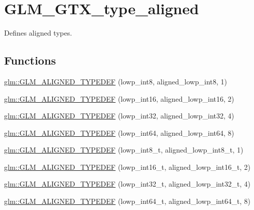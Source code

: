 \hypertarget{group__gtx__type__aligned}{}\section{G\+L\+M\+\_\+\+G\+T\+X\+\_\+type\+\_\+aligned}
\label{group__gtx__type__aligned}


Defines aligned types.  


\subsection*{Functions}
\begin{DoxyCompactItemize}
\item 
\hyperlink{group__gtx__type__aligned_gab5cd5c5fad228b25c782084f1cc30114}{glm\+::\+G\+L\+M\+\_\+\+A\+L\+I\+G\+N\+E\+D\+\_\+\+T\+Y\+P\+E\+D\+E\+F} (lowp\+\_\+int8, aligned\+\_\+lowp\+\_\+int8, 1)
\item 
\hyperlink{group__gtx__type__aligned_ga5bb5dd895ef625c1b113f2cf400186b0}{glm\+::\+G\+L\+M\+\_\+\+A\+L\+I\+G\+N\+E\+D\+\_\+\+T\+Y\+P\+E\+D\+E\+F} (lowp\+\_\+int16, aligned\+\_\+lowp\+\_\+int16, 2)
\item 
\hyperlink{group__gtx__type__aligned_gac6efa54cf7c6c86f7158922abdb1a430}{glm\+::\+G\+L\+M\+\_\+\+A\+L\+I\+G\+N\+E\+D\+\_\+\+T\+Y\+P\+E\+D\+E\+F} (lowp\+\_\+int32, aligned\+\_\+lowp\+\_\+int32, 4)
\item 
\hyperlink{group__gtx__type__aligned_ga6612eb77c8607048e7552279a11eeb5f}{glm\+::\+G\+L\+M\+\_\+\+A\+L\+I\+G\+N\+E\+D\+\_\+\+T\+Y\+P\+E\+D\+E\+F} (lowp\+\_\+int64, aligned\+\_\+lowp\+\_\+int64, 8)
\item 
\hyperlink{group__gtx__type__aligned_ga7ddc1848ff2223026db8968ce0c97497}{glm\+::\+G\+L\+M\+\_\+\+A\+L\+I\+G\+N\+E\+D\+\_\+\+T\+Y\+P\+E\+D\+E\+F} (lowp\+\_\+int8\+\_\+t, aligned\+\_\+lowp\+\_\+int8\+\_\+t, 1)
\item 
\hyperlink{group__gtx__type__aligned_ga22240dd9458b0f8c11fbcc4f48714f68}{glm\+::\+G\+L\+M\+\_\+\+A\+L\+I\+G\+N\+E\+D\+\_\+\+T\+Y\+P\+E\+D\+E\+F} (lowp\+\_\+int16\+\_\+t, aligned\+\_\+lowp\+\_\+int16\+\_\+t, 2)
\item 
\hyperlink{group__gtx__type__aligned_ga8130ea381d76a2cc34a93ccbb6cf487d}{glm\+::\+G\+L\+M\+\_\+\+A\+L\+I\+G\+N\+E\+D\+\_\+\+T\+Y\+P\+E\+D\+E\+F} (lowp\+\_\+int32\+\_\+t, aligned\+\_\+lowp\+\_\+int32\+\_\+t, 4)
\item 
\hyperlink{group__gtx__type__aligned_ga7ccb60f3215d293fd62b33b31ed0e7be}{glm\+::\+G\+L\+M\+\_\+\+A\+L\+I\+G\+N\+E\+D\+\_\+\+T\+Y\+P\+E\+D\+E\+F} (lowp\+\_\+int64\+\_\+t, aligned\+\_\+lowp\+\_\+int64\+\_\+t, 8)

\end{DoxyCompactItemize}
